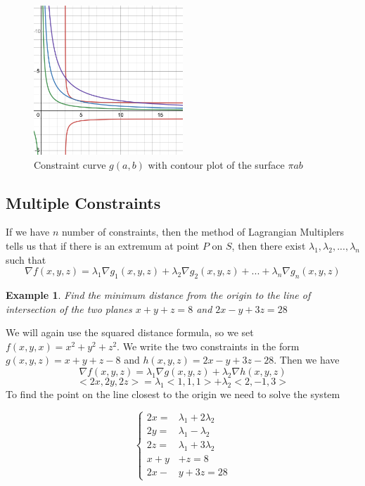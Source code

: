 \documentclass[]{article}
\newtheorem{example}{Example}
\begin{document}
\begin{figure}[h]
    \centering
    \includegraphics[width=0.50\textwidth]{example2.png}
    \caption{Constraint curve $g(a,b)$ with contour plot of the surface $\pi ab$}
    \label{fig:Level_curves}
\end{figure}


\subsection{Multiple Constraints}
If we have $n$ number of constraints, then the method of Lagrangian Multiplers tells us that if there is an extremum at point $P$ on $S$, then there exist $\lambda_1,\lambda_2,...,\lambda_n$ such that
$$
    \nabla f(x,y,z) = \lambda_1 \nabla g_1(x,y,z) + \lambda_2 \nabla g_2(x,y,z) + ... + \lambda_n \nabla g_n(x,y,z)
$$

\begin{example}
    Find the minimum distance from the origin to the line of intersection of the two planes $x+y+z=8$ and $2x-y+3z=28$ 
\end{example}

We will again use the squared distance formula, so we set $f(x,y,x)=x^2+y^2+z^2$. We write the two constraints in the form $g(x,y,z)=x+y+z-8$ and $h(x,y,z)=2x-y+3z-28$. Then we have
$$
    \nabla f(x,y,z) = \lambda_1 \nabla g(x,y,z) + \lambda_2 \nabla h(x,y,z)
$$
$$
    <2x,2y,2z> = \lambda_1<1,1,1> + \lambda_2<2,-1,3>
$$
To find the point on the line closest to the origin we need to solve the system

\begin{equation*}
    \left\{
    \begin{alignedat}{3}
        2x= & \lambda_1 + 2\lambda_2 \\
        2y= &  \lambda_1 - \lambda_2 \\
        2z= &  \lambda_1 + 3\lambda_2 \\
        x+y & +z=8 \\
        2x - & y +3z = 28
    \end{alignedat}
    \right.
\end{equation*}
\end{document}
